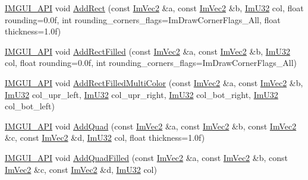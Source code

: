 \begin{DoxyCompactItemize}
\item 
\mbox{\hyperlink{imgui_8h_a43829975e84e45d1149597467a14bbf5}{I\+M\+G\+U\+I\+\_\+\+A\+PI}} void \mbox{\hyperlink{struct_im_draw_list_ac4a9baaadd92d203f61c395f6158c7e6}{Add\+Rect}} (const \mbox{\hyperlink{struct_im_vec2}{Im\+Vec2}} \&a, const \mbox{\hyperlink{struct_im_vec2}{Im\+Vec2}} \&b, \mbox{\hyperlink{imgui_8h_a118cff4eeb8d00e7d07ce3d6460eed36}{Im\+U32}} col, float rounding=0.\+0f, int rounding\+\_\+corners\+\_\+flags=\+Im\+Draw\+Corner\+Flags\+\_\+\+All, float thickness=1.\+0f)
\item 
\mbox{\hyperlink{imgui_8h_a43829975e84e45d1149597467a14bbf5}{I\+M\+G\+U\+I\+\_\+\+A\+PI}} void \mbox{\hyperlink{struct_im_draw_list_a6e8b2ae6cc8c905606e4400e4cfdeeeb}{Add\+Rect\+Filled}} (const \mbox{\hyperlink{struct_im_vec2}{Im\+Vec2}} \&a, const \mbox{\hyperlink{struct_im_vec2}{Im\+Vec2}} \&b, \mbox{\hyperlink{imgui_8h_a118cff4eeb8d00e7d07ce3d6460eed36}{Im\+U32}} col, float rounding=0.\+0f, int rounding\+\_\+corners\+\_\+flags=\+Im\+Draw\+Corner\+Flags\+\_\+\+All)
\item 
\mbox{\hyperlink{imgui_8h_a43829975e84e45d1149597467a14bbf5}{I\+M\+G\+U\+I\+\_\+\+A\+PI}} void \mbox{\hyperlink{struct_im_draw_list_ab658e574f3ef67a8d6cc0a86f13f5176}{Add\+Rect\+Filled\+Multi\+Color}} (const \mbox{\hyperlink{struct_im_vec2}{Im\+Vec2}} \&a, const \mbox{\hyperlink{struct_im_vec2}{Im\+Vec2}} \&b, \mbox{\hyperlink{imgui_8h_a118cff4eeb8d00e7d07ce3d6460eed36}{Im\+U32}} col\+\_\+upr\+\_\+left, \mbox{\hyperlink{imgui_8h_a118cff4eeb8d00e7d07ce3d6460eed36}{Im\+U32}} col\+\_\+upr\+\_\+right, \mbox{\hyperlink{imgui_8h_a118cff4eeb8d00e7d07ce3d6460eed36}{Im\+U32}} col\+\_\+bot\+\_\+right, \mbox{\hyperlink{imgui_8h_a118cff4eeb8d00e7d07ce3d6460eed36}{Im\+U32}} col\+\_\+bot\+\_\+left)
\item 
\mbox{\hyperlink{imgui_8h_a43829975e84e45d1149597467a14bbf5}{I\+M\+G\+U\+I\+\_\+\+A\+PI}} void \mbox{\hyperlink{struct_im_draw_list_ac3fd62862000b2a7a4e7f61da0a4e3fd}{Add\+Quad}} (const \mbox{\hyperlink{struct_im_vec2}{Im\+Vec2}} \&a, const \mbox{\hyperlink{struct_im_vec2}{Im\+Vec2}} \&b, const \mbox{\hyperlink{struct_im_vec2}{Im\+Vec2}} \&c, const \mbox{\hyperlink{struct_im_vec2}{Im\+Vec2}} \&d, \mbox{\hyperlink{imgui_8h_a118cff4eeb8d00e7d07ce3d6460eed36}{Im\+U32}} col, float thickness=1.\+0f)
\item 
\mbox{\hyperlink{imgui_8h_a43829975e84e45d1149597467a14bbf5}{I\+M\+G\+U\+I\+\_\+\+A\+PI}} void \mbox{\hyperlink{struct_im_draw_list_abefdc71c2dc6b6331193aee3ff680ed0}{Add\+Quad\+Filled}} (const \mbox{\hyperlink{struct_im_vec2}{Im\+Vec2}} \&a, const \mbox{\hyperlink{struct_im_vec2}{Im\+Vec2}} \&b, const \mbox{\hyperlink{struct_im_vec2}{Im\+Vec2}} \&c, const \mbox{\hyperlink{struct_im_vec2}{Im\+Vec2}} \&d, \mbox{\hyperlink{imgui_8h_a118cff4eeb8d00e7d07ce3d6460eed36}{Im\+U32}} col)

\end{DoxyCompactItemize}
